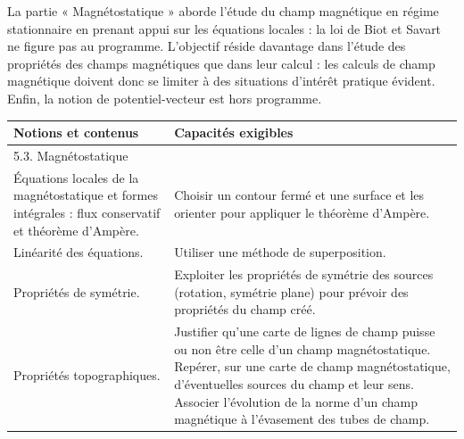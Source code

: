 {\footnotesize
\begin{flushleft}
    La partie « Magnétostatique » aborde l'étude du champ magnétique en régime stationnaire en prenant appui sur les équations locales : la loi de Biot et Savart ne figure pas au programme. L'objectif réside davantage dans l'étude des propriétés des champs magnétiques que dans leur calcul : les calculs de champ magnétique doivent donc se limiter à des situations d'intérêt pratique évident. Enfin, la notion de potentiel-vecteur est hors programme.
\end{flushleft}

        \begin{tabularx}{\linewidth}{|p{}|X|}
            \hline 
            \textbf{Notions et contenus} & \textbf{Capacités exigibles} \\
            \hline 
            \multicolumn{2}{|l|}{5.3. Magnétostatique} \\
            \hline 
            Équations locales de la magnétostatique et formes intégrales : flux conservatif et théorème d'Ampère.  & 
            Choisir un contour fermé et une surface et les orienter pour appliquer le théorème d'Ampère. \\
            \hline 
             Linéarité des équations.  & Utiliser une méthode de superposition.  \\
            \hline 
             Propriétés de symétrie. & Exploiter les propriétés de symétrie des sources (rotation, symétrie plane) pour prévoir des propriétés du champ créé. \\
            \hline
            Propriétés topographiques.  & Justifier qu'une carte de lignes de champ puisse ou non être celle d'un champ magnétostatique.
            Repérer, sur une carte de champ magnétostatique, d'éventuelles sources du champ et leur sens.
            Associer l'évolution de la norme d'un champ magnétique à l'évasement des tubes de champ. \\
        \hline 
        \end{tabularx}
        
}
